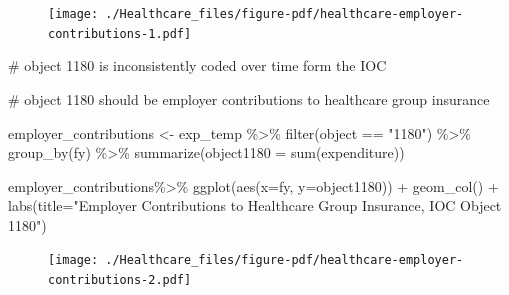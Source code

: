 \documentclass[
  letterpaper,
  DIV=11,
  numbers=noendperiod]{scrreport}
\newenvironment{Shaded}{\begin{snugshade}}{\end{snugshade}}
\newcommand{\AttributeTok}[1]{\textcolor[rgb]{0.40,0.45,0.13}{#1}}
\newcommand{\CommentTok}[1]{\textcolor[rgb]{0.37,0.37,0.37}{#1}}
\newcommand{\FunctionTok}[1]{\textcolor[rgb]{0.28,0.35,0.67}{#1}}
\newcommand{\NormalTok}[1]{\textcolor[rgb]{0.00,0.23,0.31}{#1}}
\newcommand{\OtherTok}[1]{\textcolor[rgb]{0.00,0.23,0.31}{#1}}
\newcommand{\SpecialCharTok}[1]{\textcolor[rgb]{0.37,0.37,0.37}{#1}}
\newcommand{\StringTok}[1]{\textcolor[rgb]{0.13,0.47,0.30}{#1}}
\begin{document}
\begin{figure}[H]

{\centering \texttt{[image: ./Healthcare\_files/figure-pdf/healthcare-employer-contributions-1.pdf]}

}

\end{figure}

\begin{Shaded}
\begin{Highlighting}[]
\CommentTok{\# object 1180 is inconsistently coded over time form the IOC }

\CommentTok{\# object 1180 should be employer contributions to healthcare group insurance}

\NormalTok{employer\_contributions }\OtherTok{\textless{}{-}}\NormalTok{ exp\_temp }\SpecialCharTok{\%\textgreater{}\%} 
  \FunctionTok{filter}\NormalTok{(object }\SpecialCharTok{==} \StringTok{"1180"}\NormalTok{) }\SpecialCharTok{\%\textgreater{}\%} 
  \FunctionTok{group\_by}\NormalTok{(fy) }\SpecialCharTok{\%\textgreater{}\%} 
  \FunctionTok{summarize}\NormalTok{(}\AttributeTok{object1180 =} \FunctionTok{sum}\NormalTok{(expenditure)) }

\NormalTok{employer\_contributions}\SpecialCharTok{\%\textgreater{}\%} 
  \FunctionTok{ggplot}\NormalTok{(}\FunctionTok{aes}\NormalTok{(}\AttributeTok{x=}\NormalTok{fy, }\AttributeTok{y=}\NormalTok{object1180)) }\SpecialCharTok{+} 
  \FunctionTok{geom\_col}\NormalTok{() }\SpecialCharTok{+} 
  \FunctionTok{labs}\NormalTok{(}\AttributeTok{title=}\StringTok{"Employer Contributions to Healthcare Group Insurance, IOC Object 1180"}\NormalTok{)}
\end{Highlighting}
\end{Shaded}

\begin{figure}[H]

{\centering \texttt{[image: ./Healthcare\_files/figure-pdf/healthcare-employer-contributions-2.pdf]}

}

\end{figure}
\end{document}

